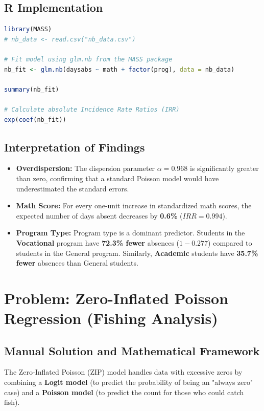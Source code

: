 \documentclass[12pt]{article}
\begin{document}
\subsection{R Implementation}
\begin{lstlisting}[language=R, caption=R Negative Binomial Regression]
library(MASS)
# nb_data <- read.csv("nb_data.csv")

# Fit model using glm.nb from the MASS package
nb_fit <- glm.nb(daysabs ~ math + factor(prog), data = nb_data)

summary(nb_fit)

# Calculate absolute Incidence Rate Ratios (IRR)
exp(coef(nb_fit))
\end{lstlisting}

\subsection{Interpretation of Findings}
\begin{itemize}
    \item \textbf{Overdispersion:} The dispersion parameter $\alpha = 0.968$ is significantly greater than zero, confirming that a standard Poisson model would have underestimated the standard errors.
    \item \textbf{Math Score:} For every one-unit increase in standardized math scores, the expected number of days absent decreases by \textbf{0.6\%} ($IRR=0.994$).
    \item \textbf{Program Type:} Program type is a dominant predictor. Students in the \textbf{Vocational} program have \textbf{72.3\% fewer} absences ($1 - 0.277$) compared to students in the General program. Similarly, \textbf{Academic} students have \textbf{35.7\% fewer} absences than General students.
\end{itemize}











\newpage
\section{Problem: Zero-Inflated Poisson Regression (Fishing Analysis)}
\label{prob_zip_final}

\subsection{Manual Solution and Mathematical Framework}
The Zero-Inflated Poisson (ZIP) model handles data with excessive zeros by combining a \textbf{Logit model} (to predict the probability of being an "always zero" case) and a \textbf{Poisson model} (to predict the count for those who could catch fish).
\end{document}
